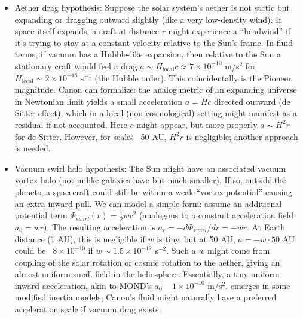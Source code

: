 \documentclass[11pt]{article}
\begin{document}
\begin{itemize}

\item 
Aether drag hypothesis: Suppose the solar system’s aether is not static but expanding or dragging outward slightly (like a very low-density wind). If space itself expands, a craft at distance $r$ might experience a “headwind” if it’s trying to stay at a constant velocity relative to the Sun’s frame. In fluid terms, if vacuum has a Hubble-like expansion, then relative to the Sun a stationary craft would feel a drag $a \sim H_{\text{local}} c \approx 7\times10^{-10}$ m/s$^2$ for $H_{\text{local}}\sim 2\times10^{-18}$ s$^{-1}$ (the Hubble order). This coincidentally is the Pioneer magnitude. Canon can formalize: the analog metric of an expanding universe in Newtonian limit yields a small acceleration $a = H c$ directed outward (de Sitter effect), which in a local (non-cosmological) setting might manifest as a residual if not accounted. Here $c$ might appear, but more properly $a \sim H^2 r$ for de Sitter. However, for scales ~50 AU, $H^2 r$ is negligible; another approach is needed.




\item 
Vacuum swirl halo hypothesis: The Sun might have an associated vacuum vortex halo (not unlike galaxies have but much smaller). If so, outside the planets, a spacecraft could still be within a weak “vortex potential” causing an extra inward pull. We can model a simple form: assume an additional potential term $\Phi_{swirl}(r) = \frac{1}{2} w r^2$ (analogous to a constant acceleration field $a_0 = w r$). The resulting acceleration is $a_r = -d\Phi_{swirl}/dr = -w r$. At Earth distance (1 AU), this is negligible if $w$ is tiny, but at 50 AU, $a = -w \cdot 50$ AU could be ~$8\times10^{-10}$ if $w \sim 1.5\times10^{-12}$ s$^{-2}$. Such a $w$ might come from coupling of the solar rotation or cosmic rotation to the aether, giving an almost uniform small field in the heliosphere. Essentially, a tiny uniform inward acceleration, akin to MOND’s $a_0$ ~ $1\times10^{-10}$ m/s$^2$, emerges in some modified inertia models; Canon’s fluid might naturally have a preferred acceleration scale if vacuum drag exists.





\end{itemize}
\end{document}
